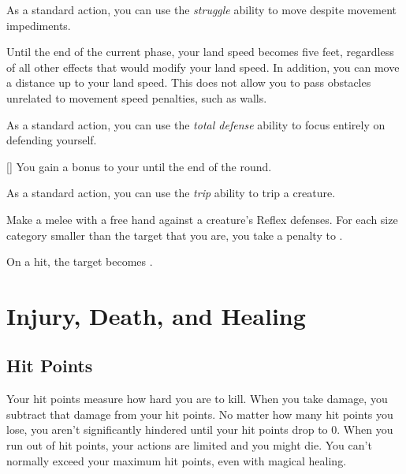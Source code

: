          As a standard action, you can use the \textit{struggle} ability to move despite movement impediments.

        \begin{freeability}{}
            Until the end of the current phase, your land speed becomes five feet, regardless of all other effects that would modify your land speed.
            In addition, you can move a distance up to your land speed.
            This does not allow you to pass obstacles unrelated to movement speed penalties, such as walls.
        \end{freeability}

         As a standard action, you can use the \textit{total defense} ability to focus entirely on defending yourself.

        \begin{freeability}{}[]
            You gain a  bonus to your  until the end of the round.
        \end{freeability}

         As a standard action, you can use the \textit{trip} ability to trip a creature.

        \begin{freeability}{}
            Make a melee  with a free hand against a creature's Reflex defenses.
            For each size category smaller than the target that you are, you take a  penalty to .

            On a hit, the target becomes \prone.
        \end{freeability}

\section{Injury, Death, and Healing}\label{Injury, Death, and Healing}

    \subsection{Hit Points}\label{Hit Points}
        Your hit points measure how hard you are to kill.
        When you take damage, you subtract that damage from your hit points.
        No matter how many hit points you lose, you aren't significantly hindered until your hit points drop to 0.
        When you run out of hit points, your actions are limited and you might die.
        You can't normally exceed your maximum hit points, even with magical healing.

